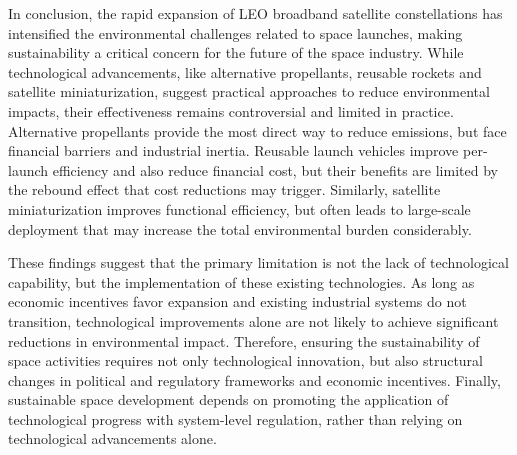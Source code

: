 \documentclass[12pt]{article}
\begin{document}
In conclusion, the rapid expansion of LEO broadband satellite constellations has intensified the environmental challenges related to space launches, making sustainability a critical concern for the future of the space industry. While technological advancements, like alternative propellants, reusable rockets and satellite miniaturization, suggest practical approaches to reduce environmental impacts, their effectiveness remains controversial and limited in practice. Alternative propellants provide the most direct way to reduce emissions, but face financial barriers and industrial inertia. Reusable launch vehicles improve per-launch efficiency and also reduce financial cost, but their benefits are limited by the rebound effect that cost reductions may trigger. Similarly, satellite miniaturization improves functional efficiency, but often leads to large-scale deployment that may increase the total environmental burden considerably.


These findings suggest that the primary limitation is not the lack of technological capability, but the implementation of these existing technologies. As long as economic incentives favor expansion and existing industrial systems do not transition, technological improvements alone are not likely to achieve significant reductions in environmental impact. Therefore, ensuring the sustainability of space activities requires not only technological innovation, but also structural changes in political and regulatory frameworks and economic incentives. Finally, sustainable space development depends on promoting the application of technological progress with system-level regulation, rather than relying on technological advancements alone.





\newpage


\end{document}
